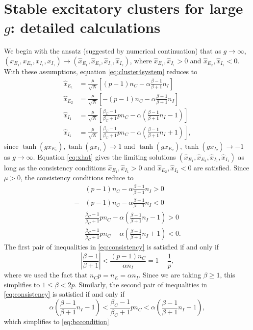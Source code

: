 \documentclass[reqno]{siamonline190516}
\begin{document}
\section{Stable excitatory clusters for large \texorpdfstring{$g$}{g}: detailed calculations} 
\label{app:C1C2I1I2_largeg}
We begin with the ansatz (suggested by numerical continuation) that as $g \rightarrow \infty$, $(x_{E_1}, x_{E_2}, x_{I_1}, x_{I_1}) \rightarrow (\hat{x}_{E_1}, \hat{x}_{E_2}, \hat{x}_{I_1}, \hat{x}_{I_2})$, where $\hat{x}_{E_1}, \hat{x}_{I_1} > 0$ and $\hat{x}_{E_2}, \hat{x}_{I_2} < 0$. 
With these assumptions, equation \cref{eq:cluster4system} reduces to 
\begin{equation}\label{eq:xhat}
    \begin{aligned}
        \hat{x}_{E_1} &= \frac{\mu}{\sqrt{N}}\left[ (p-1)n_C - \alpha \frac{\beta-1}{\beta+1}n_I \right] \\
        \hat{x}_{E_2} &= \frac{\mu}{\sqrt{N}}\left[ -(p-1)n_C - \alpha \frac{\beta-1}{\beta+1}n_I \right] \\
        \hat{x}_{I_1} &= \frac{\mu}{\sqrt{N}}\left[  \frac{\beta_C-1}{\beta_C+1} p n_C - \alpha \left( \frac{\beta-1}{\beta+1}n_I - 1 \right) \right] \\
        \hat{x}_{I_2} &= \frac{\mu}{\sqrt{N}}\left[  \frac{\beta_C-1}{\beta_C+1} p n_C - \alpha \left( \frac{\beta-1}{\beta+1}n_I + 1 \right) \right],
    \end{aligned}
\end{equation}
since $\tanh(g x_{E_1}), \tanh(g x_{I_1}) \rightarrow 1$ and $\tanh(g x_{E_2}), \tanh(g x_{I_2}) \rightarrow -1$ as $g \rightarrow \infty$. Equation \cref{eq:xhat} gives the limiting solutions $(\hat{x}_{E_1}, \hat{x}_{E_2}, \hat{x}_{I_1}, \hat{x}_{I_1})$ as long as the consistency conditions $\hat{x}_{E_1}, \hat{x}_{I_1} > 0$ and $\hat{x}_{E_2}, \hat{x}_{I_2} < 0$ are satisfied. Since $\mu > 0$, the consistency conditions reduce to
\begin{equation}\label{eq:consistency}
    \begin{aligned}
        &(p-1)n_C - \alpha \frac{\beta-1}{\beta+1}n_I > 0 \\
        -&(p-1)n_C - \alpha \frac{\beta-1}{\beta+1}n_I < 0 \\
        &\frac{\beta_C-1}{\beta_C+1} p n_C - \alpha \left( \frac{\beta-1}{\beta+1}n_I - 1 \right) > 0 \\
        &\frac{\beta_C-1}{\beta_C+1} p n_C - \alpha \left( \frac{\beta-1}{\beta+1}n_I + 1 \right) < 0.
    \end{aligned}
\end{equation}
The first pair of inequalities in \cref{eq:consistency} is satisfied if and only if
\[
    \left| \frac{\beta-1}{\beta+1} \right| < \frac{(p-1)n_C}{\alpha n_I} = 1 - \frac{1}{p},
\]
where we used the fact that $n_C p = n_E = \alpha n_I$. Since we are taking $\beta \geq 1$, this simplifies to $1 \leq \beta < 2p$. 
Similarly, the second pair of inequalities in \cref{eq:consistency} is satisfied if and only if 
\[
    \alpha \left( \frac{\beta-1}{\beta+1}n_I - 1 \right) < \frac{\beta_C-1}{\beta_C+1} p n_C < \alpha \left( \frac{\beta-1}{\beta+1}n_I + 1 \right),
\]
which simplifies to \cref{eq:bccondition}





\end{document}
